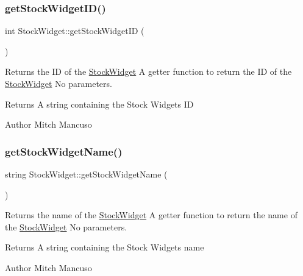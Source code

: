 \subsubsection{\texorpdfstring{get\+Stock\+Widget\+I\+D()}{getStockWidgetID()}}
{\footnotesize\ttfamily int Stock\+Widget\+::get\+Stock\+Widget\+ID (\begin{DoxyParamCaption}{ }\end{DoxyParamCaption})}



Returns the ID of the \mbox{\hyperlink{class_stock_widget}{Stock\+Widget}}  A getter function to return the ID of the \mbox{\hyperlink{class_stock_widget}{Stock\+Widget}}  No parameters. 

\begin{DoxyReturn}{Returns}
A string containing the Stock Widget\textquotesingle{}s ID 
\end{DoxyReturn}
\begin{DoxyAuthor}{Author}
Mitch Mancuso 
\end{DoxyAuthor}
\mbox{\label{class_stock_widget_ad2db18f7104a367ddc9fe56d019249cb}} 
\subsubsection{\texorpdfstring{get\+Stock\+Widget\+Name()}{getStockWidgetName()}}
{\footnotesize\ttfamily string Stock\+Widget\+::get\+Stock\+Widget\+Name (\begin{DoxyParamCaption}{ }\end{DoxyParamCaption})}



Returns the name of the \mbox{\hyperlink{class_stock_widget}{Stock\+Widget}}  A getter function to return the name of the \mbox{\hyperlink{class_stock_widget}{Stock\+Widget}}  No parameters. 

\begin{DoxyReturn}{Returns}
A string containing the Stock Widget\textquotesingle{}s name 
\end{DoxyReturn}
\begin{DoxyAuthor}{Author}
Mitch Mancuso 
\end{DoxyAuthor}
\mbox{\label{class_stock_widget_a696f274d7915cd579062e98d268b4be4}} 
